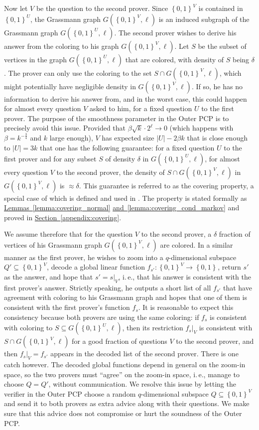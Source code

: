 \documentclass[11pt]{article}
\numberwithin{equation}{section}
\theoremstyle{definition}
\theoremstyle{plain}
\newcommand{\ie}{i.\,e.}
\newcommand{\expref}[2]{\hyperref[#2]{#1~\ref{#2}}}
\newcommand\set[1]{{\left\{ #1 \right\}}}
\newcommand\power[1]{\set{0,1}^{#1}}
\begin{document}
Now let $V$ be the question to the second prover. Since $\power{V}$ is contained in $\power{U}$, the Grassmann graph $G(\power{V},\ell)$
is an induced subgraph of the Grassmann graph $G(\power{U},\ell)$. The second prover wishes to derive his answer from the coloring to his
 graph $G(\power{V},\ell)$. Let $S$ be the subset of vertices in the graph $G(\power{U},\ell)$ that are colored, with density of $S$ being
 $\delta$. The prover can only use the coloring to the set $S \cap G(\power{V},\ell)$, which might potentially have negligible density
  in $G(\power{V},\ell)$. If so, he has no information  to derive his answer from, and in the worst case, this could happen for almost every question
  $V$ asked to him, for a fixed question $U$ to the first prover. The purpose of the
  smoothness
  parameter in the Outer PCP is to
  precisely avoid this issue. Provided that $\beta \sqrt{k} \cdot 2^\ell \to 0$ (which happens with $\beta = k^{-\frac{3}{4}}$ and
  $k$ large enough), $V$ has expected size   $|U| - 2\beta k$ that is close enough to $|U| = 3k$ that
  one has the following guarantee: for a fixed question $U$ to the first prover and for any subset $S$ of density $\delta$ in
  $G(\power{U},\ell)$, for almost every question $V$ to the second prover, the density of $S \cap G(\power{V}, \ell)$ in $G(\power{V},\ell)$
  is $\approx \delta$. This guarantee is referred to as the
  covering property,
  a special case of which is defined and used in \cite{KS}.
  The property is stated formally as \expref{Lemmas}{lemma:covering_normal} \expref{and}{lemma:covering_cond_markov} %
and proved in \expref{Section}{appendix:covering}.

 We assume therefore that for the question $V$ to the second prover,
  a %
 $\delta$ fraction of vertices of his Grassmann graph
 $G(\power{V},\ell)$ are colored. In a similar manner as the first prover, he wishes
to zoom into a $q$-dimensional subspace
 $Q' \subseteq \power{V}$, decode a global linear function $f_{s'}: \power{V} \to \power{}$, return $s'$ as the
 answer, and hope that $s' = s|_V$, \ie, that his answer is consistent with the first prover's answer. Strictly speaking,
 he outputs a short list of all $f_{s'}$ that have agreement with coloring to his Grassmann graph and hopes that one of them
 is consistent with the first prover's function $f_s$. It is reasonable to expect this consistency because both provers are using the same coloring:
 if $f_s$ is consistent with coloring to $S \subseteq G(\power{U},\ell)$, then its restriction $f_s|_V$
  is consistent with $S \cap G(\power{V},\ell)$ for a good fraction of questions $V$ to the second prover, and then
  $f_s|_V = f_{s'}$ appears in the decoded list of the second prover. There is one catch however.
  The decoded global functions depend in general on the zoom-in space, so the two provers
 must ``agree'' on the zoom-in space, \ie, manage to choose $Q=Q'$, without communication. We resolve this issue by letting the verifier
 in the Outer PCP choose a random $q$-dimensional subspace $Q \subseteq \power{V}$ and send it to both provers as extra
 advice
 along with their questions. We make sure that this advice does not compromise or hurt the soundness of the Outer PCP.
\end{document}
